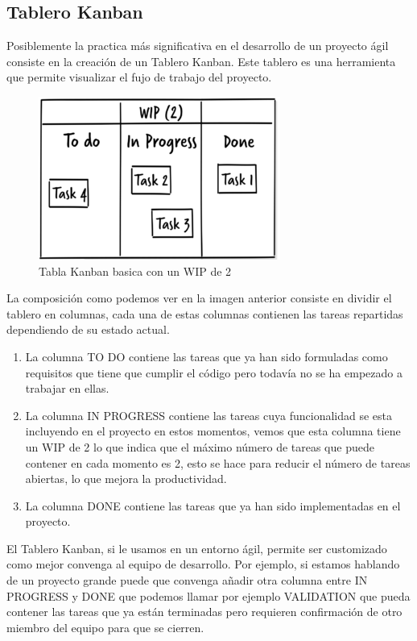 \documentclass[12pt,a4paper]{article}
\begin{document}
	\subsection{Tablero Kanban}
	Posiblemente la practica más significativa en el desarrollo de un proyecto ágil consiste en la creación de un Tablero Kanban. Este tablero es una herramienta que permite visualizar el fujo de trabajo del proyecto.\\
\begin{figure}[H]
\centering
  \centering
  \includegraphics[width=0.5\linewidth]{kanban generico}
\caption{Tabla Kanban basica con un WIP de 2}
\label{fig:subrgrafo}
\end{figure}
	La composición como podemos ver en la imagen anterior consiste en dividir el tablero en columnas, cada una de estas columnas contienen las tareas repartidas dependiendo de su estado actual.\\
	\begin{enumerate}
	\item La columna TO DO contiene las tareas que ya han sido formuladas como requisitos que tiene que cumplir el código pero todavía no se ha empezado a trabajar en ellas.
	\item La columna IN PROGRESS contiene las tareas cuya funcionalidad se esta incluyendo en el proyecto en estos momentos, vemos que esta columna tiene un WIP de 2 lo que indica que el máximo número de tareas que puede contener en cada momento es 2, esto se hace para reducir el número de tareas abiertas, lo que mejora la productividad.
	\item La columna DONE contiene las tareas que ya han sido implementadas en el proyecto.
	\end{enumerate}
	 El Tablero Kanban, si le usamos en un entorno ágil, permite ser customizado como mejor convenga al equipo de desarrollo. Por ejemplo, si estamos hablando de un proyecto grande puede que convenga añadir otra columna entre IN PROGRESS y DONE que podemos llamar por ejemplo VALIDATION que pueda contener las tareas que ya están terminadas pero requieren confirmación de otro miembro del equipo para que se cierren.
\end{document}
